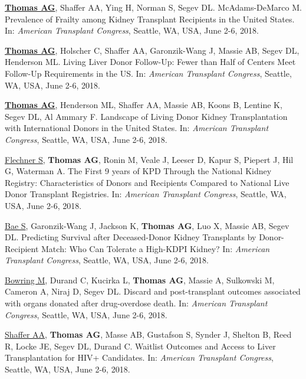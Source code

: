 \documentclass[10pt]{article}
\begin{document}
\begin{bibenum}

\item \underline{\textbf{Thomas AG}}, Shaffer AA, Ying H, Norman S,
  Segev DL. McAdams-DeMarco M.
  Prevalence of Frailty among Kidney Transplant Recipients in the United States.
  In: \emph{American Transplant Congress},
  Seattle, WA, USA, June 2-6, 2018.

\item \underline{\textbf{Thomas AG}}, Holscher C, Shaffer AA,
  Garonzik-Wang J, Massie AB, Segev DL, Henderson ML.
  Living Liver Donor Follow-Up: Fewer than Half of
  Centers Meet Follow-Up Requirements in the US.
  In: \emph{American Transplant Congress},
  Seattle, WA, USA, June 2-6, 2018.

\item \underline{\textbf{Thomas AG}}, Henderson ML, Shaffer AA,
  Massie AB, Koons B, Lentine K, Segev DL, Al Ammary F.
  Landscape of Living Donor Kidney Transplantation with
  International Donors in the United States.
  In: \emph{American Transplant Congress},
  Seattle, WA, USA, June 2-6, 2018.

\item \underline{Flechner S}, \textbf{Thomas AG}, Ronin M,
  Veale J, Leeser D, Kapur S, Piepert J, Hil G, Waterman A.
  The First 9 years of KPD Through the National Kidney Registry:
  Characteristics of Donors and Recipients Compared to
  National Live Donor Transplant Registries.
  In: \emph{American Transplant Congress},
  Seattle, WA, USA, June 2-6, 2018.

\item \underline{Bae S}, Garonzik-Wang J, Jackson K, \textbf{Thomas AG},
  Luo X, Massie AB, Segev DL.
  Predicting Survival after Deceased-Donor Kidney Transplants by
  Donor-Recipient Match: Who Can Tolerate a High-KDPI Kidney?
  In: \emph{American Transplant Congress},
  Seattle, WA, USA, June 2-6, 2018.

\item \underline{Bowring M}, Durand C, Kucirka L, \textbf{Thomas AG},
  Massie A, Sulkowski M, Cameron A, Niraj D, Segev DL.
  Discard and post-transplant outcomes associated with organs
  donated after drug-overdose death.
  In: \emph{American Transplant Congress},
  Seattle, WA, USA, June 2-6, 2018.

\item \underline{Shaffer AA}, \textbf{Thomas AG}, Masse AB, Gustafson S,
  Synder J, Shelton B, Reed R, Locke JE, Segev DL, Durand C.
  Waitlist Outcomes and Access to Liver Transplantation for HIV+ Candidates.
  In: \emph{American Transplant Congress},
  Seattle, WA, USA, June 2-6, 2018.


\end{bibenum}
\end{document}
